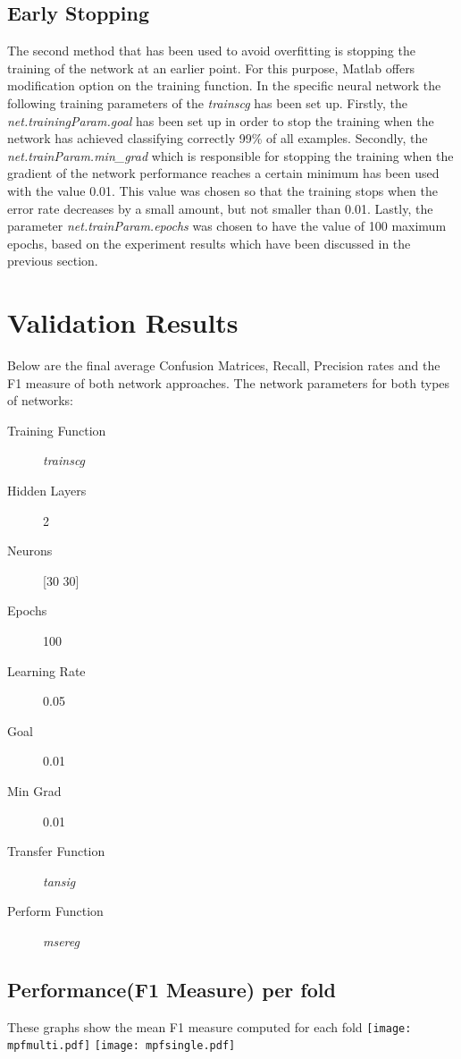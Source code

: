 \documentclass[a4paper,11pt]{article}
\begin{document}
\subsection{Early Stopping}
The second method that has been used to avoid overfitting is stopping the training of the network at an earlier point. For this purpose, Matlab offers modification option on the training function. In the specific neural network the following training parameters of the \emph{trainscg} has been set up. Firstly, the \emph{net.trainingParam.goal} has been set up in order to stop the training when the network has achieved classifying correctly 99\% of all examples. Secondly, the \emph{net.trainParam.min\_grad} which is responsible for stopping the training when the gradient of the network performance reaches a certain minimum has been used with the value 0.01. This value was chosen so that the training stops when the error rate decreases by a small amount, but not smaller than 0.01.  Lastly, the parameter \emph{net.trainParam.epochs} was chosen to have the value of 100 maximum epochs, based on the experiment results which have been discussed in the previous section.

\section{Validation Results}
Below are the final average Confusion Matrices, Recall, Precision rates and the F1 measure of both network approaches. The network parameters for both types of networks:

\begin{description}
  \item[Training Function] \emph{trainscg}
  \item[Hidden Layers] 2
  \item[Neurons] [30 30]
  \item[Epochs] 100
  \item[Learning Rate] 0.05
  \item[Goal] 0.01
  \item[Min Grad] 0.01
  \item[Transfer Function] \emph{tansig}
  \item[Perform Function] \emph{msereg}
\end{description}


\subsection{Performance(F1 Measure) per fold}
These graphs show the mean F1 measure computed for each fold
\texttt{[image: mpfmulti.pdf]}
\texttt{[image: mpfsingle.pdf]}
\end{document}
